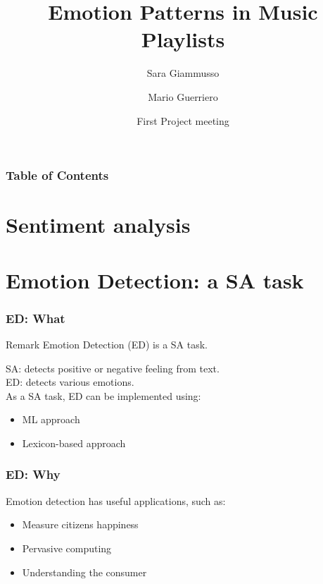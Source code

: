 \documentclass[xcolor=dvipsnames]{beamer}
\title[Emotion Patterns in Music Playlists] %
{Emotion Patterns in Music Playlists}
\author[Sara, Mario] %
{Sara Giammusso\inst{1}\inst{2} \and Mario Guerriero \inst{1}\inst{2}}
\institute[EURECOM] %
{
 \inst{1}
 Data Science Department, EURECOM, T\'el\'ecom ParisTech\\
  \inst{2}%
 Department of Control and Computer Engineering, Politecnico di Torino, Italy
}
\date[2018 March 22] %
{First Project meeting}
\begin{document}
\frame{\titlepage}

\begin{frame}
\frametitle{Table of Contents}
\tableofcontents
\end{frame}

\section{Sentiment analysis}


\section{Emotion Detection: a SA task}

\begin{frame}
\frametitle{ED: What}
\begin{block}{Remark}
Emotion Detection (ED) is a SA task.
\end{block}
SA: detects positive or negative feeling from text.\\
ED: detects various emotions.\\
As a SA task, ED can be implemented using:
\begin{itemize}
\item ML approach
\item Lexicon-based approach
\end{itemize}
\end{frame}

\begin{frame}
\frametitle{ED: Why}
Emotion detection has useful applications, such as: 
\begin{itemize}
\item Measure citizens happiness
\item Pervasive computing
\item Understanding the consumer
\end{itemize}
\end{frame}
\end{document}
